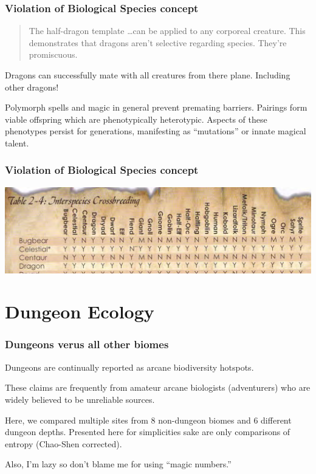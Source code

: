 \documentclass{beamer}\usepackage{graphicx, color}
\begin{document}
\begin{frame}
  \frametitle{Violation of Biological Species concept}

  \begin{quote}
    The half-dragon template \dots can be applied to any corporeal creature. This demonstrates that dragons aren't selective regarding species. They're promiscuous.
  \end{quote}

  Dragons can successfully mate with all creatures from there plane. Including other dragons!

  Polymorph spells and magic in general prevent premating barriers. Pairings form viable offspring which are phenotypically heterotypic. Aspects of these phenotypes persist for generations, manifesting as ``mutations'' or innate magical talent.

\end{frame}

\begin{frame}
  \frametitle{Violation of Biological Species concept}

  \includegraphics[width = \textwidth, keepaspectratio = true]{dragon_chart}

\end{frame}


\section{Dungeon Ecology}
\begin{frame}
  \frametitle{Dungeons verus all other biomes}

  Dungeons are continually reported as arcane biodiversity hotspots.

  These claims are frequently from amateur arcane biologists (adventurers) who are widely believed to be unreliable sources.

  Here, we compared multiple sites from 8 non-dungeon biomes and 6 different dungeon depths. Presented here for simplicities sake are only comparisons of entropy (Chao-Shen corrected).

  \footnotesize{Also, I'm lazy so don't blame me for using ``magic numbers.''}
\end{frame}
\end{document}
